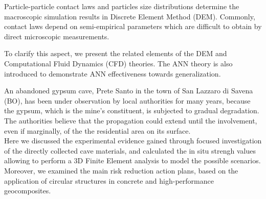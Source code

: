 Particle-particle contact laws and particles size distributions determine the
macroscopic simulation results in Discrete Element Method (DEM). 
Commonly, contact laws depend on semi-empirical parameters which 
are difficult to obtain by direct microscopic measurements. 

To clarify this aspect, we present the related elements of the DEM
and Computational Fluid Dynamics (CFD) theories.
The ANN theory is also introduced to demonstrate ANN effectiveness towards
generalization.

An abandoned gypsum cave, Prete Santo in the town of San Lazzaro di Savena (BO), has been under observation by local authorities for many years, because the gypsum, which is the mine's constituent, is subjected to gradual degradation.\\
The authorities believe that the propagation could extend until the involvement, even if marginally, of the the residential area on its surface.\\
Here we discussed the experimental evidence gained through focused investigation of the directly collected cave materials, and calculated
the in situ strengh values allowing to perform a 3D Finite Element analysis to model the possible scenarios.\\
Moreover, we examined the main risk reduction action plans, based on the application of circular structures in concrete and
high-performance geocomposites.


\endgroup			

\vfill

%

